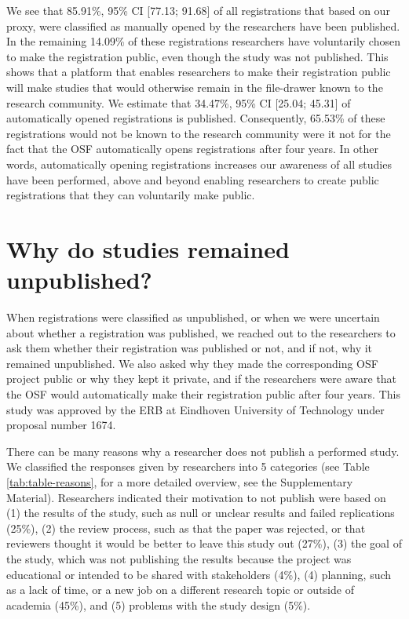 \documentclass[
  ,jou, a4paper,floatsintext]{apa6}
\begin{document}
We see that 85.91\%, 95\% CI {[}77.13; 91.68{]} of all registrations that based on our proxy, were classified as manually opened by the researchers have been published. In the remaining 14.09\% of these registrations researchers have voluntarily chosen to make the registration public, even though the study was not published. This shows that a platform that enables researchers to make their registration public will make studies that would otherwise remain in the file-drawer known to the research community. We estimate that 34.47\%, 95\% CI {[}25.04; 45.31{]} of automatically opened registrations is published. Consequently, 65.53\% of these registrations would not be known to the research community were it not for the fact that the OSF automatically opens registrations after four years. In other words, automatically opening registrations increases our awareness of all studies have been performed, above and beyond enabling researchers to create public registrations that they can voluntarily make public.

\hypertarget{why-do-studies-remained-unpublished}{%
\section{Why do studies remained unpublished?}\label{why-do-studies-remained-unpublished}}

When registrations were classified as unpublished, or when we were uncertain about whether a registration was published, we reached out to the researchers to ask them whether their registration was published or not, and if not, why it remained unpublished. We also asked why they made the corresponding OSF project public or why they kept it private, and if the researchers were aware that the OSF would automatically make their registration public after four years. This study was approved by the ERB at Eindhoven University of Technology under proposal number 1674.

There can be many reasons why a researcher does not publish a performed study. We classified the responses given by researchers into 5 categories (see Table \ref{tab:table-reasons}, for a more detailed overview, see the Supplementary Material). Researchers indicated their motivation to not publish were based on (1) the results of the study, such as null or unclear results and failed replications (25\%), (2) the review process, such as that the paper was rejected, or that reviewers thought it would be better to leave this study out (27\%), (3) the goal of the study, which was not publishing the results because the project was educational or intended to be shared with stakeholders (4\%), (4) planning, such as a lack of time, or a new job on a different research topic or outside of academia (45\%), and (5) problems with the study design (5\%).
\end{document}
